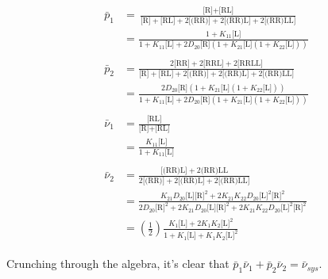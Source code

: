 \begin{align}
	\begin{split}
	\bar{p}_1& = \frac{\text{[R]} + \text{[RL]}}{\text{[R]} + \text{[RL]} + 2 \text{[(RR)]} + 2 \text{[(RR)L]} + 2 \text{[(RR)LL]}} \\[3ex]
	& = \frac{1 + K_{11}\text{[L]}}{1 + K_{11}\text{[L]} + 2 D_{20}\text{[R]}(1 + K_{21}\text{[L]}(1 + K_{22}\text{[L]}))}
	\end{split}
	\\[3ex]
	 \begin{split}
	 \bar{p}_2& = \frac{2 \text{[RR]} + 2 \text{[RRL]} + 2 \text{[RRLL]}}{\text{[R]} +  \text{[RL]} + 2 \text{[(RR)]} + 2 \text{[(RR)L]} + 2 \text{[(RR)LL]}} \\[3ex]
	 & = \frac{2 D_{20}\text{[R]}(1 + K_{21}\text{[L]}(1 + K_{22}\text{[L]}))}{1 + K_{11}\text{[L]} + 2 D_{20}\text{[R]}(1 + K_{21}\text{[L]}(1 + K_{22}\text{[L]}))}
	 \end{split}
\\[3ex]
	\begin{split}
	\bar{\nu}_1& = \frac{\text{[RL]}}{\text{[R]} + \text{[RL]}} \\[3ex]
	& = \frac{K_{11}\text{[L]}}{1 + K_{11}\text{[L]}}
	\end{split}
\\[3ex]
	\begin{split}
		\bar{\nu}_2& = \frac{\text{[(RR)L]} + 2 \text{(RR)LL}}{2 \text{[(RR)]} + 2 \text{[(RR)L]} + 2 \text{[(RR)LL}]} \\[3ex]
		& = \frac{K_{21} D_{20} \text{[L]} \text{[R]}^2 + 2 K_{21} K_{22} D_{20} \text{[L]}^2 \text{[R]}^2}{2 D_{20} \text{[R]}^2 + 2 K_{21} D_{20} \text{[L]} \text{[R]}^2 +  2 K_{21} K_{22} D_{20} \text{[L]}^2 \text{[R]}^2} \\[3ex]
		& = \left(\frac{1}{2}\right) \frac{K_1 \text{[L]} + 2 K_1 K_2 \text{[L]}^2}{1 + K_1 \text{[L]} + K_1 K_2 \text{[L]}^2}
	\end{split}
\end{align}


Crunching through the algebra, it's clear that \(\bar{p}_1 \bar{\nu}_1 + \bar{p}_2 \bar{\nu}_2  = \bar{\nu}_{sys}\).

